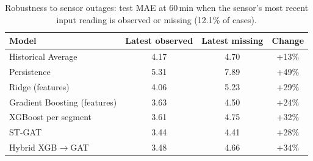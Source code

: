 \begin{table}[t]
\centering
\caption{Robustness to sensor outages: test MAE at 60\,min when the sensor's most recent input reading is observed or missing (12.1\% of cases).}
\label{tab:p2robust}
\setlength{\tabcolsep}{3.5pt}
\begin{tabular}{lccc}
\toprule
Model & Latest observed & Latest missing & Change \\
\midrule
Historical Average & 4.17 & 4.70 & +13\% \\
Persistence & 5.31 & 7.89 & +49\% \\
Ridge (features) & 4.06 & 5.23 & +29\% \\
Gradient Boosting (features) & 3.63 & 4.50 & +24\% \\
XGBoost per segment & 3.61 & 4.75 & +32\% \\
ST-GAT & 3.44 & 4.41 & +28\% \\
Hybrid XGB$\to$GAT & 3.48 & 4.66 & +34\% \\
\bottomrule
\end{tabular}
\end{table}